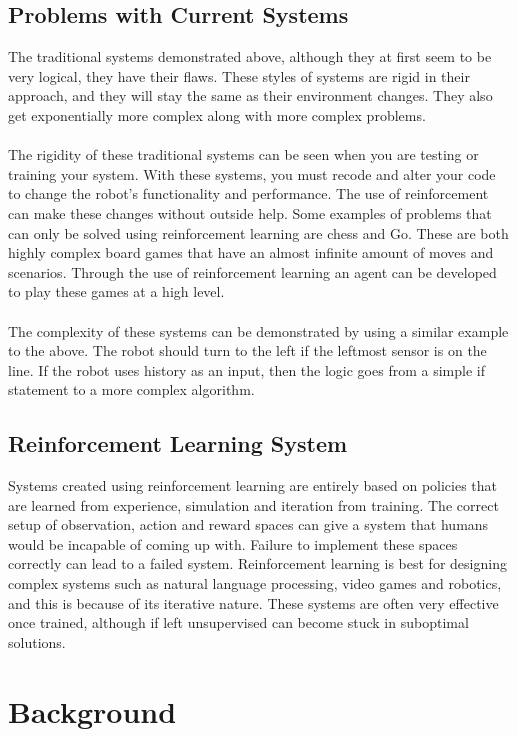 \documentclass[a4paper,12pt]{article}
\begin{document}
\subsection{Problems with Current Systems}

The traditional systems demonstrated above, although they at first seem to be very logical, they have their flaws. These styles of systems are rigid in their approach, and they will stay the same as their environment changes. They also get exponentially more complex along with more complex problems.
\\\\
The rigidity of these traditional systems can be seen when you are testing or training your system. With these systems, you must recode and alter your code to change the robot's functionality and performance. The use of reinforcement can make these changes without outside help. Some examples of problems that can only be solved using reinforcement learning are chess and Go. These are both highly complex board games that have an almost infinite amount of moves and scenarios. Through the use of reinforcement learning an agent can be developed to play these games at a high level.  
\\\\
The complexity of these systems can be demonstrated by using a similar example to the above. The robot should turn to the left if the leftmost sensor is on the line. If the robot uses history as an input, then the logic goes from a simple if statement to a more complex algorithm.


\subsection{Reinforcement Learning System}

Systems created using reinforcement learning are entirely based on policies that are learned from experience, simulation and iteration from training. The correct setup of observation, action and reward spaces can give a system that humans would be incapable of coming up with. Failure to implement these spaces correctly can lead to a failed system. Reinforcement learning is best for designing complex systems such as natural language processing, video games and robotics, and this is because of its iterative nature. These systems are often very effective once trained, although if left unsupervised can become stuck in suboptimal solutions.

\section{Background}
\end{document}
